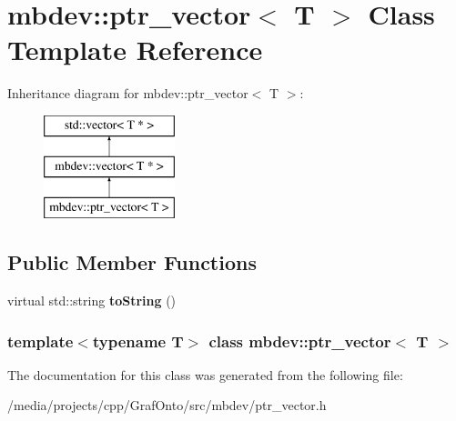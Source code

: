 \hypertarget{classmbdev_1_1ptr__vector}{\section{mbdev\-:\-:ptr\-\_\-vector$<$ \-T $>$ \-Class \-Template \-Reference}
\label{classmbdev_1_1ptr__vector}
}
\-Inheritance diagram for mbdev\-:\-:ptr\-\_\-vector$<$ \-T $>$\-:\begin{figure}[H]
\begin{center}
\leavevmode
\includegraphics[height=3.000000cm]{classmbdev_1_1ptr__vector}
\end{center}
\end{figure}
\subsection*{\-Public \-Member \-Functions}
\begin{DoxyCompactItemize}
\item 
\hypertarget{classmbdev_1_1ptr__vector_ab35e93145913085d1c05afab6be17a1e}{virtual std\-::string {\bfseries to\-String} ()}\label{classmbdev_1_1ptr__vector_ab35e93145913085d1c05afab6be17a1e}

\end{DoxyCompactItemize}
\subsubsection*{template$<$typename \-T$>$ class mbdev\-::ptr\-\_\-vector$<$ T $>$}



\-The documentation for this class was generated from the following file\-:\begin{DoxyCompactItemize}
\item 
/media/projects/cpp/\-Graf\-Onto/src/mbdev/ptr\-\_\-vector.\-h\end{DoxyCompactItemize}
